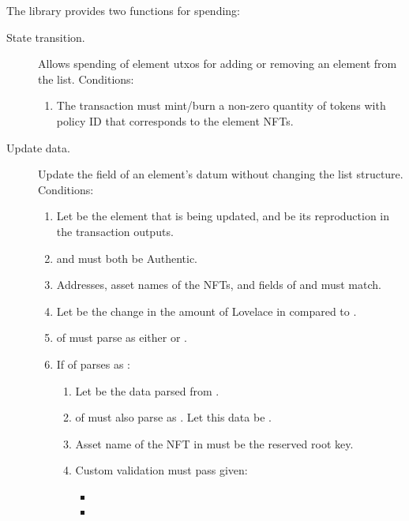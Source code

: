 \documentclass[../midgard.tex]{subfiles}
\begin{document}
The library provides two functions for spending:
\begin{description}
  \item[State transition.] Allows spending of element utxos for adding or removing an element from the list.
    Conditions:
    \begin{enumerate}
      \item The transaction must mint/burn a non-zero quantity of tokens with policy ID that corresponds to the element NFTs.
    \end{enumerate}
  \item[Update data.] Update the  field of an element's datum without changing the list structure.
    Conditions:
    \begin{enumerate}
      \item Let  be the element that is being updated, and  be its reproduction in the transaction outputs.
      \item {} and  must both be Authentic.
      \item Addresses, asset names of the NFTs, and  fields of  and  must match.
      \item Let  be the change in the amount of Lovelace in  compared to .
      \item {} of  must parse as either  or .
        \item If  of  parses as :
          \begin{enumerate}[resume]
            \item Let  be the data parsed from .
            \item {} of  must also parse as .
              Let this data be .
            \item Asset name of the NFT in  must be the reserved root key.
            \item Custom validation must pass given:
              \begin{itemize}
                \item {}
                \item {}

\end{itemize}
\end{enumerate}
\end{enumerate}
\end{description}
\end{document}
